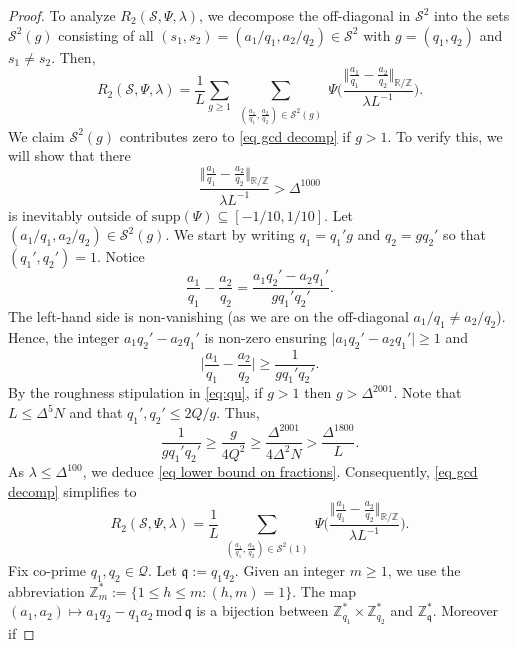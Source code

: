 \documentclass[10pt,a4paper]{amsart}
\begin{document}
\begin{proof}
To analyze $R_2(\mathcal{S},\Psi,\lambda)$,
we decompose the off-diagonal in $\mathcal{S}^2$ 
into the sets $\mathcal{S}^2(g)$ consisting of all
$(s_1,s_2)=(a_1/q_1,a_2/q_2)\in  
\mathcal{S}^2$ with $g=(q_1,q_2)$ and $s_1\neq s_2$.
Then, 
\begin{equation}\label{eq gcd decomp}
R_2(\mathcal{S},\Psi,\lambda)
= 
\frac{1}{L} 
\sum_{g\geq 1} \sum_{\substack{(\frac{a_1}{q_1},
\frac{a_2}{q_2})\in \mathcal{S}^2(g)}} 
\Psi\Big(\frac{\Vert \frac{a_1}{q_1} - 
\frac{a_2}{q_2} \Vert_{\mathbb{R}/\mathbb{Z}}}
{\lambda L^{-1}}\Big).
\end{equation}
We claim $\mathcal{S}^2(g)$ contributes zero to \eqref{eq gcd decomp} if $g>1$. To verify this,
we will show that there
\begin{equation}\label{eq lower bound on fractions}
\frac{\Vert \frac{a_1}{q_1} - 
\frac{a_2}{q_2} \Vert_{\mathbb{R}/\mathbb{Z}}}
{\lambda L^{-1}} > \Delta^{1000}
\end{equation}
is inevitably outside of 
$\mathrm{supp}(\Psi)\subseteq [-1/10,1/10]$.
Let $(a_1/q_1,a_2/q_2)\in \mathcal{S}^2(g)$. We start 
by writing $q_1=q_1' g$ and $q_2=gq_2'$ so that $(q_1',q_2')=1$.
Notice
$$
\frac{a_1}{q_1} - 
\frac{a_2}{q_2}
= 
\frac{a_1q_2' - a_2 q_1'}{g q_1'q_2'}.
$$
The left-hand side is non-vanishing (as we
are on the off-diagonal $a_1/q_1\neq a_2/q_2$).
Hence, the integer $a_1q_2' - a_2 q_1'$ is non-zero
ensuring 
$\vert a_1q_2' - a_2 q_1'\vert \geq 1$ and
$$
\Big \vert 
\frac{a_1}{q_1} - 
\frac{a_2}{q_2}
\Big \vert \geq \frac{1}{g q_1'q_2'}.
$$
By the roughness stipulation in \eqref{eq:qu}, 
if $g>1$ then $g> \Delta^{2001}$.
Note that $L\leq \Delta^5 N$ and that $q_{1}', q_{2}' \leq 2 Q / g$.
Thus, 
$$
\frac{1}{g q_1'q_2'} \geq \frac{g}{4 Q^{2}} \geq \frac{\Delta^{2001}}{4 \Delta^{2} N}
> \frac{\Delta^{1800}}{L}.
$$
As $\lambda \leq \Delta^{100}$,
we deduce \eqref{eq lower bound on fractions}.
Consequently, \eqref{eq gcd decomp} simplifies to
$$
R_2(\mathcal{S},\Psi,\lambda)
= 
\frac{1}{L}  \sum_{\substack{(\frac{a_1}{q_1},
\frac{a_2}{q_2})\in \mathcal{S}^2(1)}} 
\Psi\Bigg(\frac{\big \Vert \frac{a_1}{q_1} - 
\frac{a_2}{q_2} \big\Vert_{\mathbb{R}/\mathbb{Z}}}
{\lambda L^{-1}}\Bigg).
$$
Fix co-prime
$q_1,q_2\in \mathcal{Q}$.
Let $\mathfrak{q}:=q_1q_2$.
Given an integer $m\geq 1$, we use the abbreviation $\mathbb{Z}_{m}^*:=\{1\leq h\leq m: (h,m)=1\}$.
The map
$(a_1,a_2)\mapsto a_1 q_2 - q_1 a_2 \,\mathrm{mod}\, \mathfrak{q}$
is a bijection 
between $\mathbb{Z}_{q_1}^*\times \mathbb{Z}_{q_2}^*$
and $\mathbb{Z}_{\mathfrak{q}}^*$. Moreover if 

\end{proof}
\end{document}
